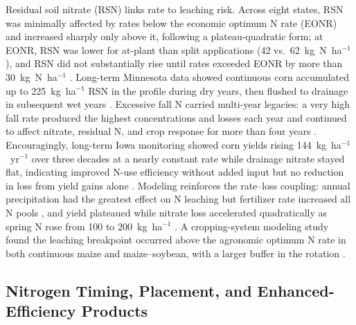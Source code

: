 Residual soil nitrate (RSN) links rate to leaching risk. Across eight states, RSN was minimally affected by rates below the economic optimum N rate (EONR) and increased sharply only above it, following a plateau-quadratic form; at EONR, RSN was lower for at-plant than split applications (42 vs.\ 62~kg~N~ha$^{-1}$), and RSN did not substantially rise until rates exceeded EONR by more than 30~kg~N~ha$^{-1}$ \parencite{Bandura2025}. Long-term Minnesota data showed continuous corn accumulated up to 225~kg~ha$^{-1}$ RSN in the profile during dry years, then flushed to drainage in subsequent wet years \parencite{Randall2001}. Excessive fall N carried multi-year legacies: a very high fall rate produced the highest concentrations and losses each year and continued to affect nitrate, residual N, and crop response for more than four years \parencite{Jaynes2015}. Encouragingly, long-term Iowa monitoring showed corn yields rising 144~kg~ha$^{-1}$~yr$^{-1}$ over three decades at a nearly constant rate while drainage nitrate stayed flat, indicating improved N-use efficiency without added input but no reduction in loss from yield gains alone \parencite{Clifford2023}. Modeling reinforces the rate--loss coupling: annual precipitation had the greatest effect on N leaching but fertilizer rate increased all N pools \parencite{Li2006}, and yield plateaued while nitrate loss accelerated quadratically as spring N rose from 100 to 200~kg~ha$^{-1}$ \parencite{Malone2007b}. A cropping-system modeling study found the leaching breakpoint occurred above the agronomic optimum N rate in both continuous maize and maize--soybean, with a larger buffer in the rotation \parencite{Pasley2021}.

\subsection{Nitrogen Timing, Placement, and Enhanced-Efficiency Products}


